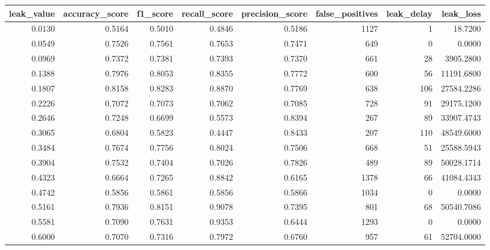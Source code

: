 \begin{tabular}{rrrrrrrr}
\toprule
leak\_value & accuracy\_score & f1\_score & recall\_score & precision\_score & false\_positives & leak\_delay & leak\_loss \\
\midrule
0.0130 & 0.5164 & 0.5010 & 0.4846 & 0.5186 & 1127 & 1 & 18.7200 \\
0.0549 & 0.7526 & 0.7561 & 0.7653 & 0.7471 & 649 & 0 & 0.0000 \\
0.0969 & 0.7372 & 0.7381 & 0.7393 & 0.7370 & 661 & 28 & 3905.2800 \\
0.1388 & 0.7976 & 0.8053 & 0.8355 & 0.7772 & 600 & 56 & 11191.6800 \\
0.1807 & 0.8158 & 0.8283 & 0.8870 & 0.7769 & 638 & 106 & 27584.2286 \\
0.2226 & 0.7072 & 0.7073 & 0.7062 & 0.7085 & 728 & 91 & 29175.1200 \\
0.2646 & 0.7248 & 0.6699 & 0.5573 & 0.8394 & 267 & 89 & 33907.4743 \\
0.3065 & 0.6804 & 0.5823 & 0.4447 & 0.8433 & 207 & 110 & 48549.6000 \\
0.3484 & 0.7674 & 0.7756 & 0.8024 & 0.7506 & 668 & 51 & 25588.5943 \\
0.3904 & 0.7532 & 0.7404 & 0.7026 & 0.7826 & 489 & 89 & 50028.1714 \\
0.4323 & 0.6664 & 0.7265 & 0.8842 & 0.6165 & 1378 & 66 & 41084.4343 \\
0.4742 & 0.5856 & 0.5861 & 0.5856 & 0.5866 & 1034 & 0 & 0.0000 \\
0.5161 & 0.7936 & 0.8151 & 0.9078 & 0.7395 & 801 & 68 & 50540.7086 \\
0.5581 & 0.7090 & 0.7631 & 0.9353 & 0.6444 & 1293 & 0 & 0.0000 \\
0.6000 & 0.7070 & 0.7316 & 0.7972 & 0.6760 & 957 & 61 & 52704.0000 \\
\bottomrule
\end{tabular}

